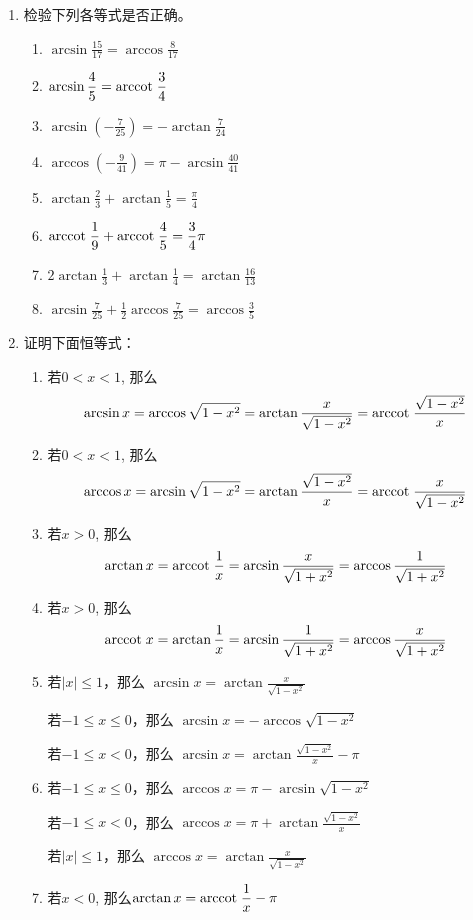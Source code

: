 \begin{enumerate}
\item 检验下列各等式是否正确。
 \begin{enumerate}
\item $\arcsin \frac{15}{17}=\arccos \frac{8}{17}$
\item $\arcsin \dfrac{4}{5}={\rm arccot\; }\dfrac{3}{4}$
\item $\arcsin \left(-\frac{7}{25}\right)=-\arctan \frac{7}{24}$
\item $\arccos \left(-\frac{9}{41}\right)=\pi-\arcsin \frac{40}{41}$
\item  $\arctan \frac{2}{3}+\arctan \frac{1}{5}=\frac{\pi}{4}$
\item ${\rm arccot\; }\dfrac{1}{9}+{\rm arccot\; }\dfrac{4}{5}=\dfrac{3}{4} \pi$
\item  $2 \arctan \frac{1}{3}+\arctan \frac{1}{4}=\arctan \frac{16}{13}$
\item $\arcsin \frac{7}{25}+\frac{1}{2} \arccos \frac{7}{25}=\arccos \frac{3}{5}$
\end{enumerate}   

\item 证明下面恒等式：
\begin{enumerate}
    \item 若$0<x<1$, 那么
\[\arcsin x=\arccos\sqrt{1-x^2}=\arctan\dfrac{x}{\sqrt{1-x^2}}={\rm arccot\; }\dfrac{\sqrt{1-x^2}}{x}\]
    \item 若$0<x<1$, 那么
    \[\arccos x=\arcsin\sqrt{1-x^2}=\arctan\dfrac{\sqrt{1-x^2}}{x}={\rm arccot\; }\dfrac{x}{\sqrt{1-x^2}}\]
    \item 若$x>0$, 那么
  \[\arctan x={\rm arccot\; } \dfrac{1}{x}=\arcsin\dfrac{x}{\sqrt{1+x^2}}=\arccos\dfrac{1}{\sqrt{1+x^2}}\]
  \item 若$x>0$, 那么
  \[{\rm arccot\; } x=\arctan \dfrac{1}{x}=\arcsin\dfrac{1}{\sqrt{1+x^2}}=\arccos\dfrac{x}{\sqrt{1+x^2}}\]
  \item 若$|x|\le 1$，那么 $\arcsin x=\arctan\frac{x}{\sqrt{1-x^2}}$
  
  若$-1\le x\le 0$，那么 $\arcsin x=-\arccos{\sqrt{1-x^2}}$

  若$-1\le x< 0$，那么 $\arcsin x=\arctan\frac{\sqrt{1-x^2}}{x}-\pi$

\item 若$-1\le x\le 0$，那么 $\arccos x=\pi-\arcsin{\sqrt{1-x^2}}$

若$-1\le x< 0$，那么 $\arccos x=\pi+\arctan\frac{\sqrt{1-x^2}}{x}$

若$|x|\le 1$，那么 $\arccos x=\arctan\frac{x}{\sqrt{1-x^2}}$

\item 若$x<0$, 那么$\arctan x={\rm arccot\; } \dfrac{1}{x}-\pi$


\end{enumerate}
\end{enumerate}
